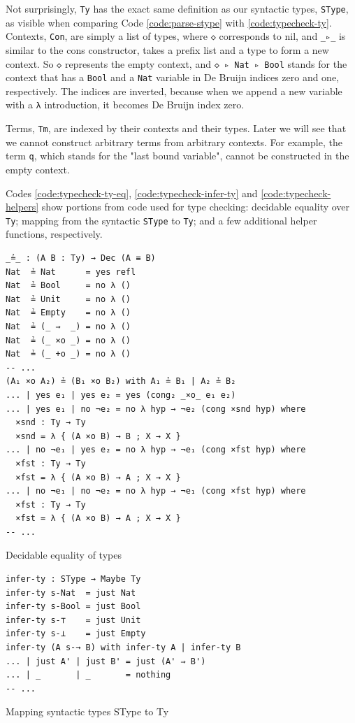 Not surprisingly, \verb$Ty$ has the exact same definition as our syntactic types, \verb$SType$, as visible when comparing Code \ref{code:parse-stype} with \ref{code:typecheck-ty}. Contexts, \verb$Con$, are simply a list of types, where \verb$◇$ corresponds to nil, and \verb$_▹_$ is similar to the cons constructor, takes a prefix list and a type to form a new context. So \verb$◇$ represents the empty context, and \verb$◇ ▹ Nat ▹ Bool$ stands for the context that has a \verb$Bool$ and a \verb$Nat$ variable in De Bruijn indices zero and one, respectively. The indices are inverted, because when we append a new variable with a \verb$λ$ introduction, it becomes De Bruijn index zero.

Terms, \verb$Tm$, are indexed by their contexts and their types. Later we will see that we cannot construct arbitrary terms from arbitrary contexts. For example, the term \verb$q$, which stands for the "last bound variable", cannot be constructed in the empty context.

Codes \ref{code:typecheck-ty-eq}, \ref{code:typecheck-infer-ty} and \ref{code:typecheck-helpers} show portions from code used for type checking: decidable equality over \verb$Ty$; mapping from the syntactic \verb$SType$ to \verb$Ty$; and a few additional helper functions, respectively.

\begin{listing}[H]
\begin{verbatim}
_≟_ : (A B : Ty) → Dec (A ≡ B)
Nat  ≟ Nat      = yes refl
Nat  ≟ Bool     = no λ ()
Nat  ≟ Unit     = no λ ()
Nat  ≟ Empty    = no λ ()
Nat  ≟ (_ ⇒  _) = no λ ()
Nat  ≟ (_ ×o _) = no λ ()
Nat  ≟ (_ +o _) = no λ ()
-- ...
(A₁ ×o A₂) ≟ (B₁ ×o B₂) with A₁ ≟ B₁ | A₂ ≟ B₂
... | yes e₁ | yes e₂ = yes (cong₂ _×o_ e₁ e₂)
... | yes e₁ | no ¬e₂ = no λ hyp → ¬e₂ (cong ×snd hyp) where
  ×snd : Ty → Ty
  ×snd = λ { (A ×o B) → B ; X → X }
... | no ¬e₁ | yes e₂ = no λ hyp → ¬e₁ (cong ×fst hyp) where
  ×fst : Ty → Ty
  ×fst = λ { (A ×o B) → A ; X → X }
... | no ¬e₁ | no ¬e₂ = no λ hyp → ¬e₁ (cong ×fst hyp) where
  ×fst : Ty → Ty
  ×fst = λ { (A ×o B) → A ; X → X }
-- ...
\end{verbatim}
\caption{Decidable equality of types}
\label{code:typecheck-ty-eq}
\end{listing}

\begin{listing}[H]
\begin{verbatim}
infer-ty : SType → Maybe Ty
infer-ty s-Nat  = just Nat
infer-ty s-Bool = just Bool
infer-ty s-⊤    = just Unit
infer-ty s-⊥    = just Empty
infer-ty (A s-→ B) with infer-ty A | infer-ty B
... | just A' | just B' = just (A' ⇒ B')
... | _       | _       = nothing
-- ...
\end{verbatim}
\caption{Mapping syntactic types SType to Ty}
\label{code:typecheck-infer-ty}
\end{listing}

